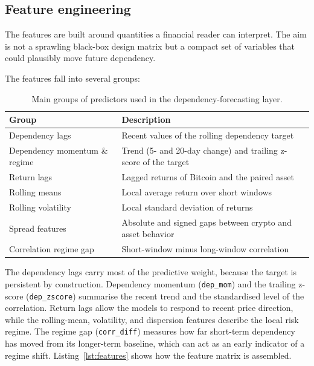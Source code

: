 \subsection{Feature engineering}

The features are built around quantities a financial reader can interpret. The aim is not a sprawling black-box design matrix but a compact set of variables that could plausibly move future dependency.

The features fall into several groups:

\begin{table}[H]
    \centering
    \caption{Main groups of predictors used in the dependency-forecasting layer.}
    \label{tab:feature_groups}
    \begin{tabular}{ll}
        \toprule
        Group & Description \\
        \midrule
        Dependency lags & Recent values of the rolling dependency target \\
        Dependency momentum \& regime & Trend (5- and 20-day change) and trailing z-score of the target \\
        Return lags & Lagged returns of Bitcoin and the paired asset \\
        Rolling means & Local average return over short windows \\
        Rolling volatility & Local standard deviation of returns \\
        Spread features & Absolute and signed gaps between crypto and asset behavior \\
        Correlation regime gap & Short-window minus long-window correlation \\
        \bottomrule
    \end{tabular}
\end{table}

The dependency lags carry most of the predictive weight, because the target is persistent by construction. Dependency momentum (\texttt{dep\_mom}) and the trailing z-score (\texttt{dep\_zscore}) summarise the recent trend and the standardised level of the correlation. Return lags allow the models to respond to recent price direction, while the rolling-mean, volatility, and dispersion features describe the local risk regime. The regime gap (\texttt{corr\_diff}) measures how far short-term dependency has moved from its longer-term baseline, which can act as an early indicator of a regime shift. Listing~\ref{lst:features} shows how the feature matrix is assembled.

